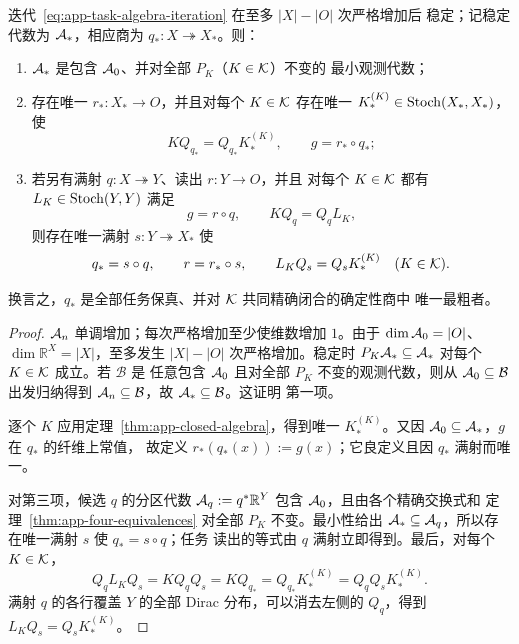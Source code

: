 \begin{theorem}[核族的任务相对最小精确宏观模型]
\label{thm:app-minimal-task-quotient}
迭代~\eqref{eq:app-task-algebra-iteration} 在至多 $|X|-|O|$ 次严格增加后
稳定；记稳定代数为 $\mathcal A_*$，相应商为
$q_*:X\twoheadrightarrow X_*$。则：
\begin{enumerate}
  \item $\mathcal A_*$ 是包含 $\mathcal A_0$、并对全部 $P_K$（$K\in\mathcal K$）不变的
  最小观测代数；
  \item 存在唯一 $r_*:X_*\to O$，并且对每个 $K\in\mathcal K$ 存在唯一
  $K_*^{(K)}\in\operatorname{Stoch}(X_*,X_*)$，使
  \begin{equation}
    KQ_{q_*}=Q_{q_*}K_*^{(K)},
    \qquad
    g=r_*\circ q_*;
    \label{eq:app-minimal-task-square}
  \end{equation}
  \item 若另有满射 $q:X\twoheadrightarrow Y$、读出 $r:Y\to O$，并且
  对每个 $K\in\mathcal K$ 都有 $L_K\in\operatorname{Stoch}(Y,Y)$ 满足
  \[
    g=r\circ q,
    \qquad
    KQ_q=Q_qL_K,
  \]
  则存在唯一满射 $s:Y\twoheadrightarrow X_*$ 使
  \begin{equation}
    q_*=s\circ q,
    \qquad r=r_*\circ s,
    \qquad L_KQ_s=Q_sK_*^{(K)}\quad(K\in\mathcal K).
    \label{eq:app-minimal-universal-property}
  \end{equation}
\end{enumerate}
换言之，$q_*$ 是全部任务保真、并对 $\mathcal K$ 共同精确闭合的确定性商中
唯一最粗者。
\end{theorem}

\begin{proof}
$\mathcal A_n$ 单调增加；每次严格增加至少使维数增加 $1$。由于
$\dim\mathcal A_0=|O|$、$\dim\mathbb R^X=|X|$，至多发生
$|X|-|O|$ 次严格增加。稳定时
$P_K\mathcal A_*\subseteq\mathcal A_*$ 对每个 $K\in\mathcal K$ 成立。若 $\mathcal B$ 是
任意包含 $\mathcal A_0$ 且对全部 $P_K$ 不变的观测代数，则从
$\mathcal A_0\subseteq\mathcal B$ 出发归纳得到
$\mathcal A_n\subseteq\mathcal B$，故 $\mathcal A_*\subseteq\mathcal B$。这证明
第一项。

逐个 $K$ 应用定理~\ref{thm:app-closed-algebra}，得到唯一
$K_*^{(K)}$。又因 $\mathcal A_0\subseteq\mathcal A_*$，$g$ 在 $q_*$ 的纤维上常值，
故定义 $r_*(q_*(x)):=g(x)$；它良定义且因 $q_*$ 满射而唯一。

对第三项，候选 $q$ 的分区代数
$\mathcal A_q:=q^*\mathbb R^Y$ 包含 $\mathcal A_0$，且由各个精确交换式和
定理~\ref{thm:app-four-equivalences} 对全部 $P_K$ 不变。最小性给出
$\mathcal A_*\subseteq\mathcal A_q$，所以存在唯一满射 $s$ 使 $q_*=s\circ q$；任务
读出的等式由 $q$ 满射立即得到。最后，对每个 $K\in\mathcal K$，
\[
 Q_qL_KQ_s=KQ_qQ_s=KQ_{q_*}
 =Q_{q_*}K_*^{(K)}=Q_qQ_sK_*^{(K)}.
\]
满射 $q$ 的各行覆盖 $Y$ 的全部 Dirac 分布，可以消去左侧的 $Q_q$，得到
$L_KQ_s=Q_sK_*^{(K)}$。
\end{proof}

